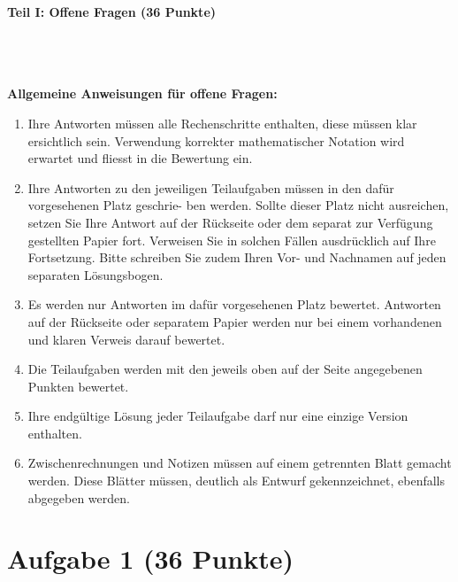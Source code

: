 
\begin{Large}
\textbf{Teil I: Offene Fragen (36 Punkte)}
\end{Large}
\\
\\
\\
\textbf{Allgemeine Anweisungen für offene Fragen:}
\\
\renewcommand{\labelenumi}{(\roman{enumi})}
\begin{enumerate}
\item
Ihre Antworten müssen alle Rechenschritte enthalten,
diese müssen klar ersichtlich sein.
Verwendung korrekter mathematischer Notation wird erwartet
und fliesst in die Bewertung ein.

\item
Ihre Antworten zu den jeweiligen Teilaufgaben müssen in den dafür vorgesehenen Platz geschrie-
ben werden. Sollte dieser Platz nicht ausreichen, setzen Sie Ihre Antwort auf der Rückseite oder
dem separat zur Verfügung gestellten Papier fort. Verweisen Sie in solchen Fällen ausdrücklich
auf Ihre Fortsetzung. Bitte schreiben Sie zudem Ihren Vor- und Nachnamen auf jeden separaten
Lösungsbogen.

\item
Es werden nur Antworten im dafür vorgesehenen Platz bewertet. Antworten auf der Rückseite
oder separatem Papier werden nur bei einem vorhandenen und klaren Verweis darauf bewertet.

\item
Die Teilaufgaben werden mit den jeweils oben auf der Seite angegebenen Punkten bewertet.

\item
Ihre endgültige Lösung jeder Teilaufgabe darf nur eine einzige Version enthalten.

\item
Zwischenrechnungen und Notizen müssen auf einem getrennten Blatt gemacht werden. Diese
Blätter müssen, deutlich als Entwurf gekennzeichnet, ebenfalls abgegeben werden.
\end{enumerate}

\newpage

\vspace{1cm}
\section*{Aufgabe 1 (36 Punkte)}
\vspace{0.4cm}
